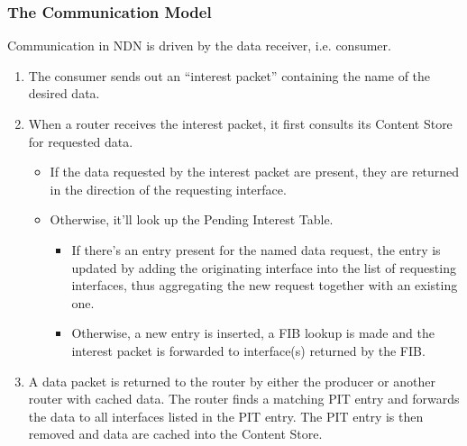                 \subsubsection{The Communication Model}

                Communication in NDN is driven by the data receiver, i.e. consumer.

                \begin{enumerate}
                    \item The consumer sends out an ``interest packet'' containing the name of the desired data.
                    \item When a router receives the interest packet, it first consults its Content Store for requested data.
                        \begin{itemize}
                            \item If the data requested by the interest packet are present, they are returned in the direction of the requesting interface.
                            \item Otherwise, it'll look up the Pending Interest Table.
                            \begin{itemize}
                                \item If there's an entry present for the named data request, the entry is updated by adding the originating interface into the list of requesting interfaces, thus aggregating the new request together with an existing one.
                                \item Otherwise, a new entry is inserted, a FIB lookup is made and the interest packet is forwarded to interface(s) returned by the FIB.
                            \end{itemize}
                        \end{itemize}
                    \item A data packet is returned to the router by either the producer or another router with cached data. The router finds a matching PIT entry and forwards the data to all interfaces listed in the PIT entry. The PIT entry is then removed and data are cached into the Content Store.
                \end{enumerate}


